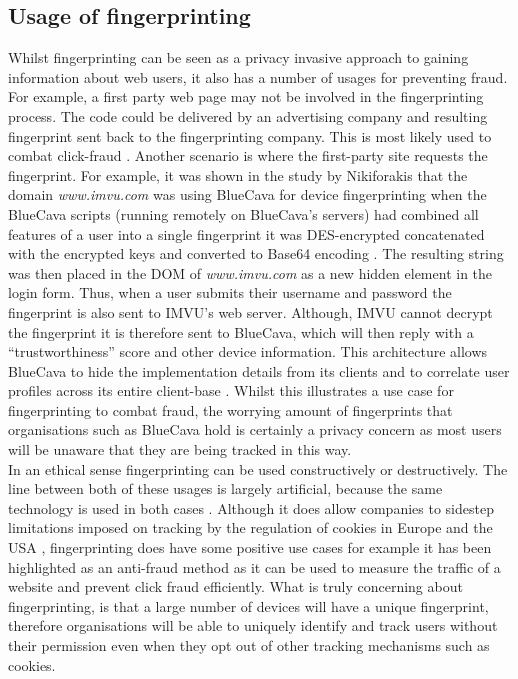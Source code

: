 \documentclass[12pt]{article}
\begin{document}
\subsection{Usage of fingerprinting}
Whilst fingerprinting can be seen as a privacy invasive approach to gaining information about web users, it also has a number of usages for preventing fraud. For example, a first party web page may not be involved in the fingerprinting process. The code could be delivered by an advertising company and resulting fingerprint sent back to the fingerprinting company. This is most likely used to combat click-fraud \parencite{cookielessMonster}. Another scenario is where the first-party site requests the fingerprint. For example, it was shown in the study by Nikiforakis that the domain \textit{www.imvu.com} was using BlueCava for device fingerprinting when the BlueCava scripts (running remotely on BlueCava's servers) had combined all features of a user into a single fingerprint it was DES-encrypted concatenated with the encrypted keys and converted to Base64 encoding \parencite{cookielessMonster}. The resulting string was then placed in the DOM of \textit{www.imvu.com} as a new hidden element in the login form. Thus, when a user submits their username and password the fingerprint is also sent to IMVU's web server. Although, IMVU cannot decrypt the fingerprint it is therefore sent to BlueCava, which will then reply with a “trustworthiness” score and other device information. This architecture allows BlueCava to hide the implementation details from its clients and to correlate user profiles across its entire client-base \parencite{cookielessMonster}. Whilst this illustrates a use case for fingerprinting to combat fraud, the worrying amount of fingerprints that organisations such as BlueCava hold is certainly a privacy concern as most users will be unaware that they are being tracked in this way.  \\ 

In an ethical sense fingerprinting can be used constructively or destructively. The line between both of these usages is largely artificial, because the same technology is used in both cases \parencite{cookielessMonster}. Although it does allow companies to sidestep limitations imposed on tracking by the regulation of cookies in Europe and the USA \parencite{dustingFP}, fingerprinting does have some positive use cases for example it has been highlighted as an anti-fraud method as it can be used to measure the traffic of a website and prevent click fraud efficiently. What is truly concerning about fingerprinting, is that a large number of devices will have a unique fingerprint, therefore organisations will be able to uniquely identify and track users without their permission even when they opt out of other tracking mechanisms such as cookies. 
\end{document}
